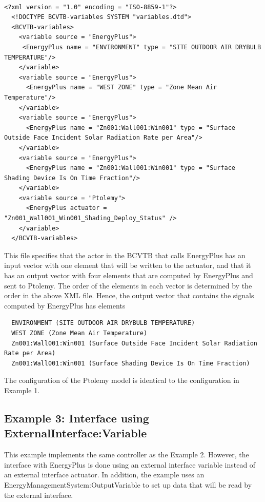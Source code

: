 \begin{lstlisting}

<?xml version = "1.0" encoding = "ISO-8859-1"?>
  <!DOCTYPE BCVTB-variables SYSTEM "variables.dtd">
  <BCVTB-variables>
    <variable source = "EnergyPlus">
     <EnergyPlus name = "ENVIRONMENT" type = "SITE OUTDOOR AIR DRYBULB TEMPERATURE"/>
    </variable>
    <variable source = "EnergyPlus">
      <EnergyPlus name = "WEST ZONE" type = "Zone Mean Air Temperature"/>
    </variable>
    <variable source = "EnergyPlus">
      <EnergyPlus name = "Zn001:Wall001:Win001" type = "Surface Outside Face Incident Solar Radiation Rate per Area"/>
    </variable>
    <variable source = "EnergyPlus">
      <EnergyPlus name = "Zn001:Wall001:Win001" type = "Surface Shading Device Is On Time Fraction"/>
    </variable>
    <variable source = "Ptolemy">
      <EnergyPlus actuator = "Zn001_Wall001_Win001_Shading_Deploy_Status" />
    </variable>
  </BCVTB-variables>
\end{lstlisting}

This file specifies that the actor in the BCVTB that calls EnergyPlus has an input vector with one element that will be written to the actuator, and that it has an output vector with four elements that are computed by EnergyPlus and sent to Ptolemy. The order of the elements in each vector is determined by the order in the above XML file. Hence, the output vector that contains the signals computed by EnergyPlus has elements

\begin{lstlisting}
  ENVIRONMENT (SITE OUTDOOR AIR DRYBULB TEMPERATURE)
  WEST ZONE (Zone Mean Air Temperature)
  Zn001:Wall001:Win001 (Surface Outside Face Incident Solar Radiation Rate per Area)
  Zn001:Wall001:Win001 (Surface Shading Device Is On Time Fraction)
\end{lstlisting}

The configuration of the Ptolemy model is identical to the configuration in Example 1.

\subsection{Example 3: Interface using ExternalInterface:Variable}\label{example-3-interface-using-externalinterfacevariable}

This example implements the same controller as the Example 2. However, the interface with EnergyPlus is done using an external interface variable instead of an external interface actuator. In addition, the example uses an EnergyManagementSystem:OutputVariable to set up data that will be read by the external interface.

